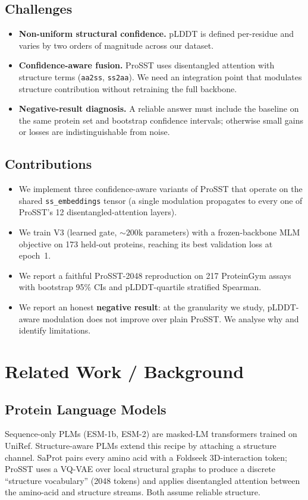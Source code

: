 \documentclass[11pt,a4paper]{article}
\begin{document}
\subsection{Challenges}
\begin{itemize}[leftmargin=*]
    \item \textbf{Non-uniform structural confidence.} pLDDT is defined
    per-residue and varies by two orders of magnitude across our dataset.
    \item \textbf{Confidence-aware fusion.} ProSST uses disentangled attention
    with structure terms (\texttt{aa2ss}, \texttt{ss2aa}). We need an
    integration point that modulates structure contribution without retraining
    the full backbone.
    \item \textbf{Negative-result diagnosis.} A reliable answer must
    include the baseline on the same protein set and bootstrap confidence
    intervals; otherwise small gains or losses are indistinguishable from
    noise.
\end{itemize}

\subsection{Contributions}
\begin{itemize}[leftmargin=*]
    \item We implement three confidence-aware variants of ProSST that operate
    on the shared \texttt{ss\_embeddings} tensor (a single modulation
    propagates to every one of ProSST's 12 disentangled-attention layers).
    \item We train V3 (learned gate, $\sim\!200$k parameters) with a
    frozen-backbone MLM objective on 173 held-out proteins, reaching its
    best validation loss at epoch~1.
    \item We report a faithful ProSST-2048 reproduction on 217 ProteinGym
    assays with bootstrap 95\% CIs and pLDDT-quartile stratified Spearman.
    \item We report an honest \textbf{negative result}: at the granularity we
    study, pLDDT-aware modulation does not improve over plain ProSST. We
    analyse why and identify limitations.
\end{itemize}

\section{Related Work / Background}

\subsection{Protein Language Models}
Sequence-only PLMs (ESM-1b, ESM-2) are masked-LM transformers trained on
UniRef. Structure-aware PLMs extend this recipe by attaching a structure
channel. SaProt pairs every amino acid with a Foldseek 3D-interaction token;
ProSST uses a VQ-VAE over local structural graphs to produce a discrete
``structure vocabulary'' (2048 tokens) and applies disentangled attention
between the amino-acid and structure streams. Both assume reliable structure.
\end{document}
